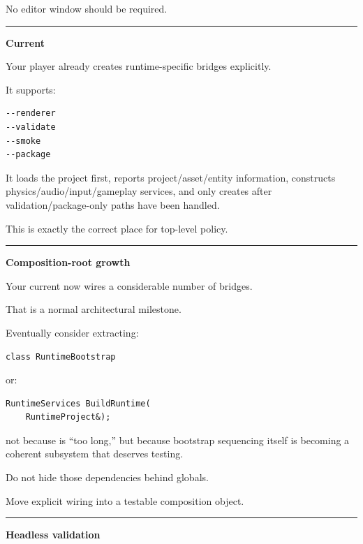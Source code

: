 No editor window should be required.

\begin{center}\rule{0.5\linewidth}{0.5pt}\end{center}

\textbf{Current }

Your player already creates runtime-specific bridges explicitly.

It supports:

\begin{verbatim}
--renderer
--validate
--smoke
--package
\end{verbatim}

It loads the project first, reports project/asset/entity information, constructs physics/audio/input/gameplay services, and only creates  after validation/package-only paths have been handled.

This is exactly the correct place for top-level policy.

\begin{center}\rule{0.5\linewidth}{0.5pt}\end{center}

\textbf{Composition-root growth}

Your current  now wires a considerable number of bridges.

That is a normal architectural milestone.

Eventually consider extracting:

\begin{verbatim}
class RuntimeBootstrap
\end{verbatim}

or:

\begin{verbatim}
RuntimeServices BuildRuntime(
    RuntimeProject&);
\end{verbatim}

not because  is ``too long,'' but because bootstrap sequencing itself is becoming a coherent subsystem that deserves testing.

Do not hide those dependencies behind globals.

Move explicit wiring into a testable composition object.

\begin{center}\rule{0.5\linewidth}{0.5pt}\end{center}

\textbf{Headless validation}

